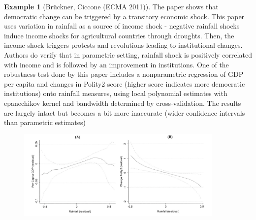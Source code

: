 \documentclass[12pt]{article}
\theoremstyle{definition}
\theoremstyle{property}
\theoremstyle{assumption}
\theoremstyle{example}
\newtheorem{example}{Example}[section]
\theoremstyle{comment}
\begin{document}
\begin{mdframed}[backgroundcolor=yellow!5]
\begin{example}[Brückner, Ciccone (ECMA 2011)]
The paper shows that democratic change can be triggered by a transitory economic shock. This paper uses variation in rainfall as a source of income shock - negative rainfall shocks induce income shocks for agricultural countries through droughts. Then, the income shock triggers protests and revolutions leading to institutional changes. Authors do verify that in parametric setting, rainfall shock is positively correlated with income and is followed by an improvement in institutions. One of the robustness test done by this paper includes a nonparametric regression of GDP per capita and changes in Polity2 score (higher score indicates more democratic institutions) onto rainfall measures, using local polynomial estimates with epanechikov kernel and bandwidth determined by cross-validation. The results are largely intact but becomes a bit more inaccurate (wider confidence intervals than parametric estimates)
\begin{figure}[H]
\centering
\includegraphics[keepaspectratio, width=0.9\textwidth]{bc_etca.png}
\end{figure}
\end{example}
\end{mdframed}

\end{document}
